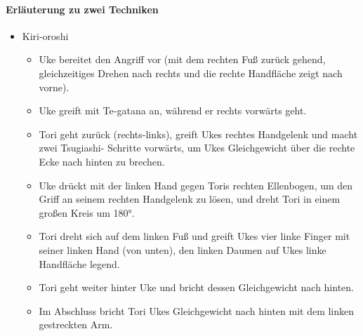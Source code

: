 \documentclass[justified, a4paper, notitlepage, captions=tableheading, nobib]{tufte-handout}
\begin{document}
\paragraph{Erläuterung zu zwei Techniken}
\label{sec:orgdeb36c2}
\begin{itemize}
\item \label{orgf6edc37}Kiri-oroshi
\begin{itemize}
\item Uke bereitet den Angriff vor (mit dem rechten Fuß zurück gehend, gleichzeitiges Drehen nach rechts und die rechte Handfläche zeigt nach vorne).
\item Uke greift mit Te-gatana an, während er rechts vorwärts geht.
\item Tori geht zurück (rechts-links), greift Ukes rechtes Handgelenk und macht zwei Tsugiashi- Schritte vorwärts, um Ukes Gleichgewicht über die rechte Ecke nach hinten zu brechen.
\item Uke drückt mit der linken Hand gegen Toris rechten Ellenbogen, um den Griff an seinem rechten Handgelenk zu lösen, und dreht Tori in einem großen Kreis um 180°.
\item Tori dreht sich auf dem linken Fuß und greift Ukes vier linke Finger mit seiner linken Hand (von unten), den linken Daumen auf Ukes linke Handfläche legend.
\item Tori geht weiter hinter Uke und bricht dessen Gleichgewicht nach hinten.
\item Im Abschluss bricht Tori Ukes Gleichgewicht nach hinten mit dem linken gestreckten Arm.
\end{itemize}


\end{itemize}
\end{document}
